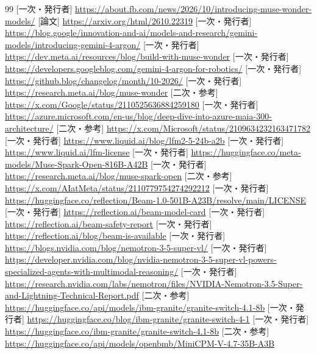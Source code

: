 \documentclass[lualatex,a4paper,10pt]{jlreq}
\begin{document}
\begin{thebibliography}{99}
 [一次・発行者] \url{https://about.fb.com/news/2026/10/introducing-muse-wonder-models/}
 [論文] \url{https://arxiv.org/html/2610.22319}
 [一次・発行者] \url{https://blog.google/innovation-and-ai/models-and-research/gemini-models/introducing-gemini-4-argon/}
 [一次・発行者] \url{https://dev.meta.ai/resources/blog/build-with-muse-wonder}
 [一次・発行者] \url{https://developers.googleblog.com/gemini-4-argon-for-robotics/}
 [一次・発行者] \url{https://github.blog/changelog/month/10-2026/}
 [一次・発行者] \url{https://research.meta.ai/blog/muse-wonder}
 [二次・参考] \url{https://x.com/Google/status/2110525636884259180}
 [一次・発行者] \url{https://azure.microsoft.com/en-us/blog/deep-dive-into-azure-maia-300-architecture/}
 [二次・参考] \url{https://x.com/Microsoft/status/2109634232163471782}
 [一次・発行者] \url{https://www.liquid.ai/blog/lfm2-5-24b-a2b}
 [一次・発行者] \url{https://www.liquid.ai/lfm-license}
 [一次・発行者] \url{https://huggingface.co/meta-models/Muse-Spark-Open-816B-A42B}
 [一次・発行者] \url{https://research.meta.ai/blog/muse-spark-open}
 [二次・参考] \url{https://x.com/AIatMeta/status/2110779754274292212}
 [一次・発行者] \url{https://huggingface.co/reflection/Beam-1.0-501B-A23B/resolve/main/LICENSE}
 [一次・発行者] \url{https://reflection.ai/beam-model-card}
 [一次・発行者] \url{https://reflection.ai/beam-safety-report}
 [一次・発行者] \url{https://reflection.ai/blog/beam-is-available}
 [一次・発行者] \url{https://blogs.nvidia.com/blog/nemotron-3-5-super-vl/}
 [一次・発行者] \url{https://developer.nvidia.com/blog/nvidia-nemotron-3-5-super-vl-powers-specialized-agents-with-multimodal-reasoning/}
 [一次・発行者] \url{https://research.nvidia.com/labs/nemotron/files/NVIDIA-Nemotron-3.5-Super-and-Lightning-Technical-Report.pdf}
 [二次・参考] \url{https://huggingface.co/api/models/ibm-granite/granite-switch-4.1-8b}
 [一次・発行者] \url{https://huggingface.co/blog/ibm-granite/granite-switch-4-1}
 [一次・発行者] \url{https://huggingface.co/ibm-granite/granite-switch-4.1-8b}
 [二次・参考] \url{https://huggingface.co/api/models/openbmb/MiniCPM-V-4.7-35B-A3B}

\end{thebibliography}
\end{document}
